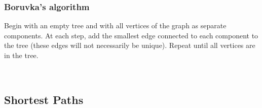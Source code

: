 \documentclass[a4paper]{article}
\theoremstyle{definition}
\begin{document}
\subsubsection{Boruvka’s algorithm}
Begin with an empty tree and with all vertices of the graph as separate components. At each step, add the smallest edge connected to each component to the tree (these edges will not necessarily be unique). Repeat until all vertices are in the tree. 
\setcounter{subfigure}{0}

\begin{figure}[H]\centering
 ~
 ~
\end{figure}
\subsection{Shortest Paths}
\end{document}
